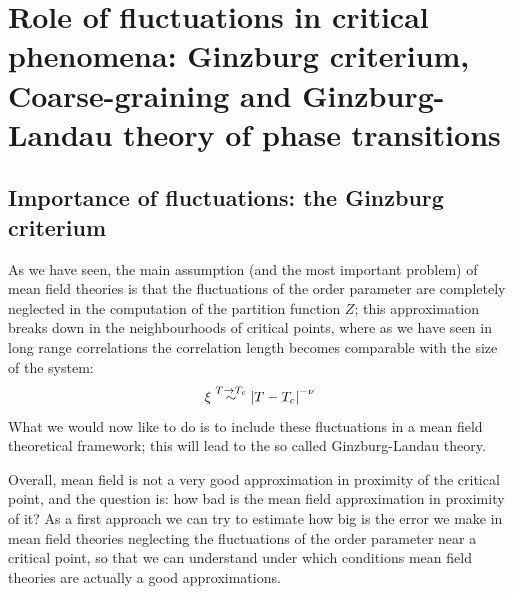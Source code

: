 \documentclass[../../Main/Main.tex]{subfiles}
\begin{document}
\chapter{Role of fluctuations in critical phenomena: Ginzburg criterium, Coarse-graining and Ginzburg-Landau theory of phase transitions}

\section{Importance of fluctuations: the Ginzburg criterium}
As we have seen, the main assumption (and the most important problem) of mean field theories is that the fluctuations of the order parameter are completely neglected in the computation of the partition function \( Z \); this approximation breaks down in the neighbourhoods of critical points, where as we have seen in long range correlations the correlation length becomes comparable with the size of the system:
\begin{equation*}
   \xi \overset{T \rightarrow T_c}{\sim } \abs{T-T_c}^{-\nu }
\end{equation*}
 What we would now like to do is to include these fluctuations in a mean field theoretical framework; this will lead to the so called Ginzburg-Landau theory.

Overall, mean field is not a very good approximation in proximity of the critical point, and the question is: how bad is the mean field approximation in proximity of it?
As a first approach we can try to estimate how big is the error we make in mean field theories neglecting the fluctuations of the order parameter near a critical point, so that we can understand under which conditions mean field theories are actually a good approximations.
\end{document}
